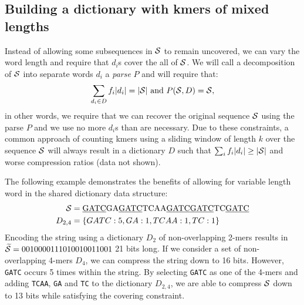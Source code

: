 \documentclass[12pt]{cmuthesis}
\begin{document}
  \subsection{Building a dictionary with kmers of mixed lengths}

  Instead of allowing some subsequences in $\mathcal{S}$ to remain uncovered, we can vary the word length and require that $d_i$s cover the all of $\mathcal{S}$. We will call a decomposition of $\mathcal{S}$ into separate words $d_i$ a \textit{parse} $P$ and will require that:
  \begin{align}
  \label{eqn:constraints}
  \sum_{d_i \in D} f_i |d_i| = |\mathcal{S}|~\textrm{and}~P(\mathcal{S}, D) = \mathcal{S},
  \end{align}
  in other words, we require that we can recover the original sequence $\mathcal{S}$ using the parse $P$ and we use no more $d_i$s than are necessary.
  Due to these constraints, a common approach of counting kmers using a sliding window of length $k$ over the sequence $\mathcal{S}$ will always result in a dictionary $D$ such that $\sum_{i} f_i |d_i| \geq |\mathcal{S}|$ and worse compression ratios (data not shown).

  The following example demonstrates the benefits of allowing for variable length word in the shared dictionary data structure:
  \begin{align*}
    \mathcal{S} &= \textrm{\underline{GATC}GA\underline{GATC}TCAA\underline{GATC}\underline{GATC}TC\underline{GATC}} \\
    D_{2,4} &= \{GATC: 5, GA: 1, TCAA: 1, TC: 1\}
  \end{align*}
  Encoding the string using a dictionary $D_2$ of non-overlapping 2-mers results in $\widetilde{\mathcal{S}} = 0010000111010010011001$ 21 bits long. If we consider a set of non-overlapping 4-mers $D_4$, we 
  can compress the string down to 16 bits. However, \texttt{GATC} occurs 5 times within the string. By selecting \texttt{GATC} as one of the 4-mers and adding \texttt{TCAA}, \texttt{GA} and \texttt{TC} to the dictionary $D_{2,4}$, we are able to compress $\mathcal{S}$ down to 13 bits while satisfying the covering constraint. 
\end{document}
